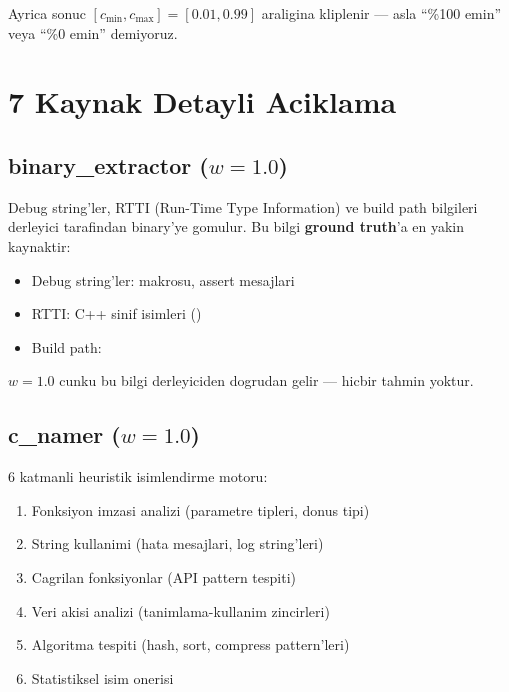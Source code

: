 Ayrica sonuc $[c_{\min}, c_{\max}] = [0.01, 0.99]$ araligina kliplenir --- asla ``\%100 emin'' veya ``\%0 emin'' demiyoruz.


\section{7 Kaynak Detayli Aciklama}
\label{sec:sources}

\subsection{binary\_extractor ($w = 1.0$)}

Debug string'ler, RTTI (Run-Time Type Information) ve build path bilgileri derleyici tarafindan binary'ye gomulur. Bu bilgi \textbf{ground truth}'a en yakin kaynaktir:

\begin{itemize}
\item Debug string'ler:  makrosu, assert mesajlari
\item RTTI: C++ sinif isimleri ()
\item Build path: 
\end{itemize}

$w = 1.0$ cunku bu bilgi derleyiciden dogrudan gelir --- hicbir tahmin yoktur.

\subsection{c\_namer ($w = 1.0$)}

6 katmanli heuristik isimlendirme motoru:

\begin{enumerate}
\item Fonksiyon imzasi analizi (parametre tipleri, donus tipi)
\item String kullanimi (hata mesajlari, log string'leri)
\item Cagrilan fonksiyonlar (API pattern tespiti)
\item Veri akisi analizi (tanimlama-kullanim zincirleri)
\item Algoritma tespiti (hash, sort, compress pattern'leri)
\item Statistiksel isim onerisi
\end{enumerate}

